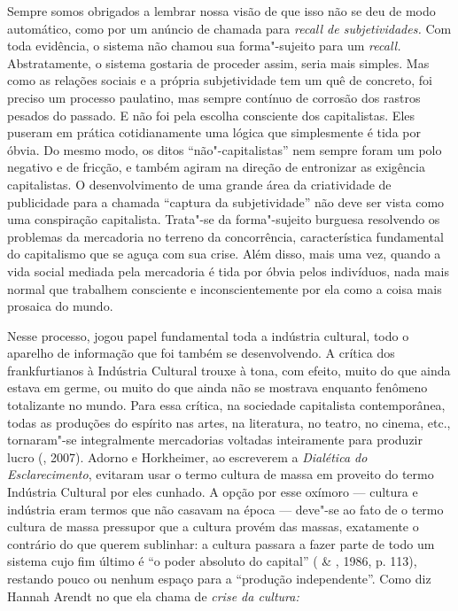 Sempre somos obrigados a lembrar nossa visão de que isso não se deu de
modo automático, como por um anúncio de chamada para \emph{recall de
subjetividades.} Com toda evidência, o sistema não chamou sua
forma"-sujeito para um \emph{recall.} Abstratamente, o sistema gostaria
de proceder assim, seria mais simples. Mas como as relações sociais e a
própria subjetividade tem um quê de concreto, foi preciso um processo
paulatino, mas sempre contínuo de corrosão dos rastros pesados do
passado. E não foi pela escolha consciente dos capitalistas. Eles
puseram em prática cotidianamente uma lógica que simplesmente é tida por
óbvia. Do mesmo modo, os ditos ``não"-capitalistas'' nem sempre foram um
polo negativo e de fricção, e também agiram na direção de entronizar as
exigência capitalistas. O desenvolvimento de uma grande área da
criatividade de publicidade para a chamada ``captura da subjetividade''
não deve ser vista como uma conspiração capitalista. Trata"-se da
forma"-sujeito burguesa resolvendo os problemas da mercadoria no terreno
da concorrência, característica fundamental do capitalismo que se aguça
com sua crise. Além disso, mais uma vez, quando a vida social mediada
pela mercadoria é tida por óbvia pelos indivíduos, nada mais normal que
trabalhem consciente e inconscientemente por ela como a coisa mais
prosaica do mundo.

Nesse processo, jogou papel fundamental toda a indústria cultural, todo
o aparelho de informação que foi também se desenvolvendo. A crítica dos
frankfurtianos à Indústria Cultural trouxe à tona, com efeito, muito do
que ainda estava em germe, ou muito do que ainda não se mostrava
enquanto fenômeno totalizante no mundo. Para essa crítica, na sociedade
capitalista contemporânea, todas as produções do espírito nas artes, na
literatura, no teatro, no cinema, etc., tornaram"-se integralmente
mercadorias voltadas inteiramente para produzir lucro (, 2007).
Adorno e Horkheimer, ao escreverem a \emph{Dialética do Esclarecimento},
evitaram usar o termo cultura de massa em proveito do termo Indústria
Cultural por eles cunhado. A opção por esse oxímoro --- cultura e
indústria eram termos que não casavam na época --- deve"-se ao fato de o
termo cultura de massa pressupor que a cultura provém das massas,
exatamente o contrário do que querem sublinhar: a cultura passara a
fazer parte de todo um sistema cujo fim último é ``o poder absoluto do
capital'' ( \& , 1986, p. 113), restando pouco ou nenhum
espaço para a ``produção independente''. Como diz Hannah Arendt no que
ela chama de \emph{crise da cultura:}

